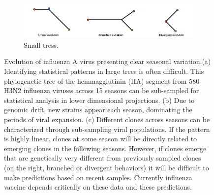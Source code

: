 \documentclass[a4paper,11pt]{article}
\begin{document}
\begin{figure}
    \begin{subfigure}{\linewidth}
    \centering
    \includegraphics[width=4in]{figures/influenza_schematic_part2.png}
    \caption{Small tress.}
    \end{subfigure}

    \caption{Evolution of influenza A virus presenting clear seasonal variation.(a) Identifying statistical patterns in large trees is often difficult. This phylogenetic tree of the hemmagglutinin (HA) segment from 580 H3N2 influenza viruses across 15 seasons  can be  sub-sampled for statistical analysis in lower dimensional projections. (b)  Due to genomic drift, new strains appear each season, dominating the periods of viral expansion. (c) Different clones across seasons can be characterized through sub-sampling viral populations. If the pattern is highly linear, clones at some season will be directly related to emerging clones in the following seasons. However, if clones emerge that are genetically very different from previously sampled clones (on the right, branched or divergent behaviors) it will be difficult to make predictions based on recent samples. Currently influenza vaccine depends critically on these data and these predictions.}
     \label{fig:flu_schematic}
\end{figure}
\end{document}
